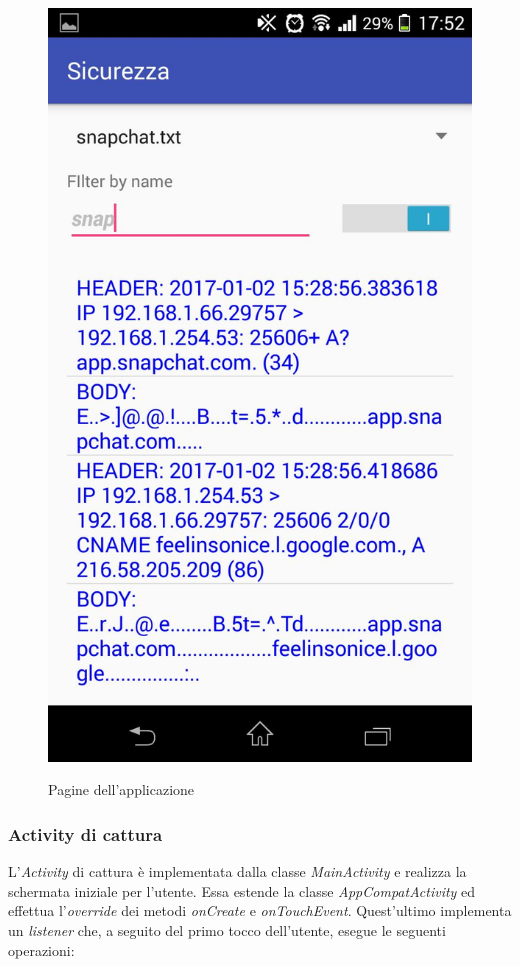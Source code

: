 \documentclass[12pt]{article} %
\begin{document}
\begin{figure}[htbp]
{\includegraphics[scale=0.2]{./activity2active.jpeg}}
\caption{Pagine dell'applicazione\label{fig:apk}}
\end{figure} 
 
\subsubsection{Activity di cattura} %
L'\textit{Activity} di cattura è implementata dalla classe \textit{MainActivity} e realizza la schermata iniziale per l'utente. Essa estende la classe \textit{AppCompatActivity} ed effettua l'\textit{override} dei metodi \textit{onCreate} e \textit{onTouchEvent}. Quest'ultimo implementa un \textit{listener} che, a seguito del primo tocco dell'utente, esegue le seguenti operazioni:
\end{document}
